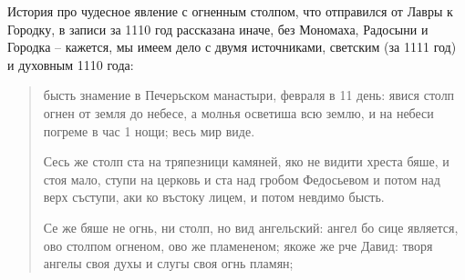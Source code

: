 История про чудесное явление с огненным столпом, что отправился от Лавры к Городку, в записи за 1110 год рассказана иначе, без Мономаха, Радосыни и Городка – кажется, мы имеем дело с двумя источниками, светским (за 1111 год) и духовным 1110 года:

\begin{quotation}
бысть знамение в Печерьском манастыри, февраля в 11 день: явися столп огнен от земля до небесе, а молнья осветиша всю землю, и на небеси погреме в час 1 нощи; весь мир виде. 

Сесь же столп ста на тряпезници камяней, яко не видити хреста бяше, и стоя мало, ступи на церковь и ста над гробом Федосьевом и потом над верх съступи, аки ко въстоку лицем, и потом невдимо бысть.

Се же бяше не огнь, ни столп, но вид ангельский: ангел бо сице является, ово столпом огненом, ово же пламененом; якоже же рче Давид: творя ангелы своя духы и слугы своя огнь пламян;
\end{quotation}
